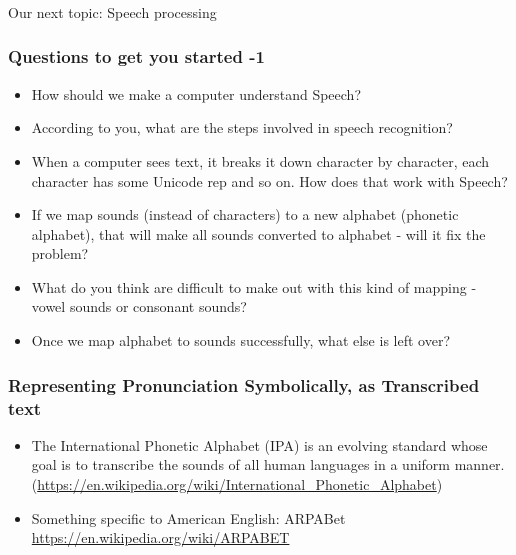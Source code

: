 \documentclass{beamer}
\begin{document}
\begin{frame}
\frametitle{}
\Large Our next topic: Speech processing
\end{frame}

\begin{frame}
\frametitle{Questions to get you started -1}
\begin{itemize}
 \item How should we make a computer understand Speech? \pause
\item According to you, what are the steps involved in speech recognition? \pause
\item When a computer sees text, it breaks it down character by character, each character has some Unicode rep and so on. How does that work with Speech? \pause
\item If we map sounds (instead of characters) to a new alphabet (phonetic alphabet), that will make all sounds converted to alphabet - will it fix the problem? \pause
\item What do you think are difficult to make out with this kind of mapping - vowel sounds or consonant sounds? \pause
\item Once we map alphabet to sounds successfully, what else is left over? 
\end{itemize}
\end{frame}

\begin{frame}
\frametitle{Representing Pronunciation Symbolically, as Transcribed text}
\begin{itemize}
\item The International Phonetic Alphabet (IPA) is an evolving standard whose goal is to transcribe the sounds of all human languages in a uniform manner. 
\\ (\url{https://en.wikipedia.org/wiki/International_Phonetic_Alphabet})
\item Something specific to American English: ARPABet
\\ \url{https://en.wikipedia.org/wiki/ARPABET}
\end{itemize}
\end{frame}
\end{document}
